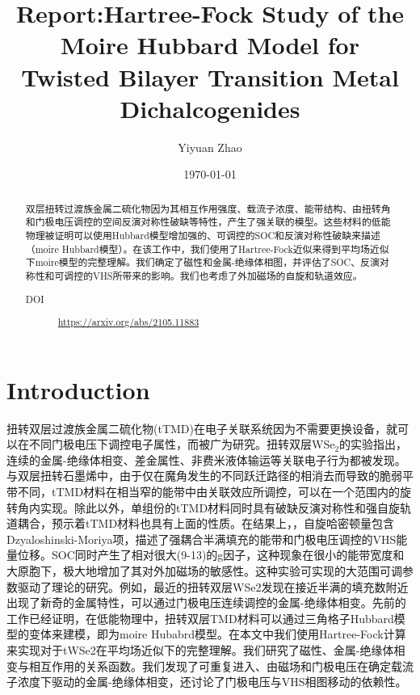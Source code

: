 \documentclass[reprint, aps, prb, showkeys]{revtex4-2}
\begin{document}
\title{Report:Hartree-Fock Study of the Moire Hubbard Model for \\
Twisted Bilayer Transition Metal Dichalcogenides}

\author{Yiyuan Zhao}
\date{\today}

\begin{abstract}
双层扭转过渡族金属二硫化物因为其相互作用强度、载流子浓度、能带结构、由扭转角和门极电压调控的空间反演对称性破缺等特性，产生了强关联的模型。这些材料的低能物理被证明可以使用Hubbard模型增加强的、可调控的SOC和反演对称性破缺来描述（moire Hubbard模型）。在该工作中，我们使用了Hartree-Fock近似来得到平均场近似下moire模型的完整理解。我们确定了磁性和金属-绝缘体相图，并评估了SOC、反演对称性和可调控的VHS所带来的影响。我们也考虑了外加磁场的自旋和轨道效应。
\begin{description}
    \item[DOI] \url{https://arxiv.org/abs/2105.11883}
\end{description}
\end{abstract}


\maketitle

\section{Introduction}
扭转双层过渡族金属二硫化物(tTMD)在电子关联系统因为不需要更换设备，就可以在不同门极电压下调控电子属性，而被广为研究。扭转双层WSe$_2$的实验指出，连续的金属-绝缘体相变、差金属性、非费米液体输运等关联电子行为都被发现。与双层扭转石墨烯中，由于仅在魔角发生的不同跃迁路径的相消去而导致的脆弱平带不同，tTMD材料在相当窄的能带中由关联效应所调控，可以在一个范围内的旋转角内实现。除此以外，单组份的tTMD材料同时具有破缺反演对称性和强自旋轨道耦合，预示着tTMD材料也具有上面的性质。在结果上，，自旋哈密顿量包含Dzyaloshinski-Moriya项，描述了强耦合半满填充的能带和门极电压调控的VHS能量位移。SOC同时产生了相对很大(9-13)的g因子，这种现象在很小的能带宽度和大原胞下，极大地增加了其对外加磁场的敏感性。这种实验可实现的大范围可调参数驱动了理论的研究。例如，最近的扭转双层WSe2发现在接近半满的填充数附近出现了新奇的金属特性，可以通过门极电压连续调控的金属-绝缘体相变。先前的工作已经证明，在低能物理中，扭转双层TMD材料可以通过三角格子Hubbard模型的变体来建模，即为moire Hubabrd模型。在本文中我们使用Hartree-Fock计算来实现对于tWSe2在平均场近似下的完整理解。我们研究了磁性、金属-绝缘体相变与相互作用的关系函数。我们发现了可重复进入、由磁场和门极电压在确定载流子浓度下驱动的金属-绝缘体相变，还讨论了门极电压与VHS相图移动的依赖性。
\end{document}
